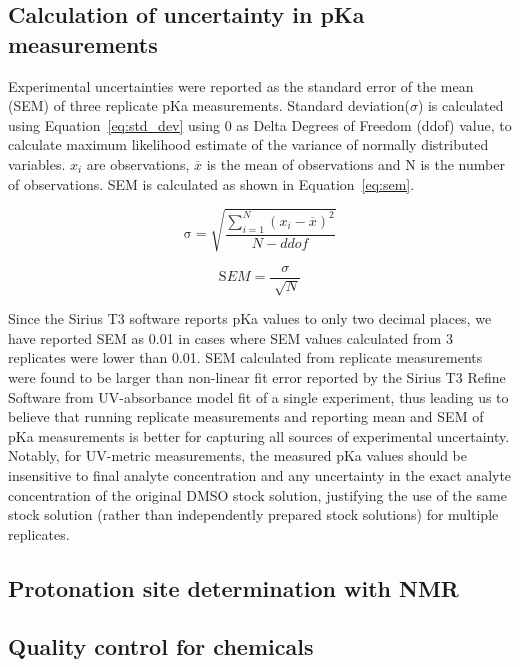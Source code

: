 \documentclass[9pt,lineno]{elife}
\begin{document}
\subsection{Calculation of uncertainty in pKa measurements}
Experimental uncertainties were reported as the standard error of the mean (SEM) of three replicate pKa measurements. 
Standard deviation($\sigma$) is calculated using Equation~\ref{eq:std_dev} using 0 as Delta Degrees of Freedom (ddof) value, to calculate maximum likelihood estimate of the variance of normally distributed variables. $x_i$ are observations, $\overline{x}$ is the mean of observations and N is the number of observations. SEM is calculated as shown in Equation~\ref{eq:sem}.

\begin{equation}
\mathrm\sigma = \sqrt{\frac{\sum_{i=1}^N (x_i - \overline{x})^2}{N-ddof} } 
\label{eq:std_dev}
\end{equation}

\begin{equation}
\mathrm SEM = \frac{\sigma}{\sqrt[]{N}} 
\label{eq:sem}
\end{equation}

Since the Sirius T3 software reports pKa values to only two decimal places, we have reported SEM as 0.01 in cases where SEM values calculated from 3 replicates were lower than 0.01. 
SEM calculated from replicate measurements were found to be larger than non-linear fit error reported by the Sirius T3 Refine Software from UV-absorbance model fit of a single experiment, thus leading us to believe that running replicate measurements and reporting mean and SEM of pKa measurements is better for capturing all sources of experimental uncertainty.
Notably, for UV-metric measurements, the measured pKa values should be insensitive to final analyte concentration and any uncertainty in the exact analyte concentration of the original DMSO stock solution, justifying the use of the same stock solution (rather than independently prepared stock solutions) for multiple replicates.

\subsection{Protonation site determination with NMR}

\subsection{Quality control for chemicals}
\end{document}
